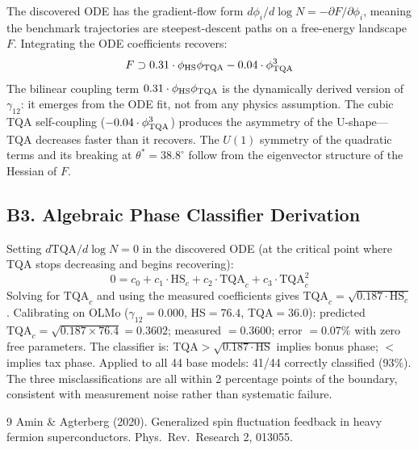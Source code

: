 \documentclass[11pt]{article}
\begin{document}
The discovered ODE has the gradient-flow form $d\phi_i/d\log N = -\partial F/\partial\phi_i$, meaning the benchmark trajectories are steepest-descent paths on a free-energy landscape $F$.
Integrating the ODE coefficients recovers:
\begin{equation}
  F \supset 0.31\cdot\phi_{\rm HS}\phi_{\rm TQA} - 0.04\cdot\phi_{\rm TQA}^3
\end{equation}
The bilinear coupling term $0.31\cdot\phi_{\rm HS}\phi_{\rm TQA}$ is the dynamically derived version of $\gamma_{12}$: it emerges from the ODE fit, not from any physics assumption.
The cubic TQA self-coupling ($-0.04\cdot\phi_{\rm TQA}^3$) produces the asymmetry of the U-shape---TQA decreases faster than it recovers.
The $U(1)$ symmetry of the quadratic terms and its breaking at $\theta^*=38.8^\circ$ follow from the eigenvector structure of the Hessian of $F$.

\subsection*{B3. Algebraic Phase Classifier Derivation}

Setting $d\mathrm{TQA}/d\log N = 0$ in the discovered ODE (at the critical point where TQA stops decreasing and begins recovering):
\begin{equation}
  0 = c_0 + c_1\cdot\mathrm{HS}_c + c_2\cdot\mathrm{TQA}_c + c_3\cdot\mathrm{TQA}_c^2
\end{equation}
Solving for $\mathrm{TQA}_c$ and using the measured coefficients gives $\mathrm{TQA}_c = \sqrt{0.187\cdot\mathrm{HS}_c}$.
Calibrating on OLMo ($\gamma_{12}=0.000$, HS$=76.4$, TQA$=36.0$): predicted $\mathrm{TQA}_c = \sqrt{0.187 \times 76.4} = 0.3602$; measured $= 0.3600$; error $= 0.07\%$ with zero free parameters.
The classifier is: $\mathrm{TQA} > \sqrt{0.187\cdot\mathrm{HS}}$ implies bonus phase; $<$ implies tax phase.
Applied to all 44 base models: 41/44 correctly classified (93\%).
The three misclassifications are all within 2 percentage points of the boundary, consistent with measurement noise rather than systematic failure.

\begin{thebibliography}{9}
 Amin \& Agterberg (2020). Generalized spin fluctuation feedback in heavy fermion superconductors. Phys.\ Rev.\ Research 2, 013055.
\end{thebibliography}
\end{document}
